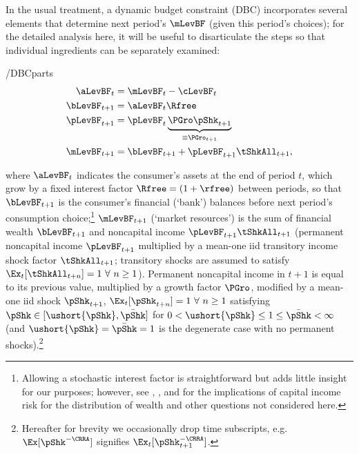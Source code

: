 \documentclass[BufferStockTheory]{subfiles}
\begin{document}
In the usual treatment, a dynamic budget constraint (DBC) incorporates
several elements that determine next period's $\mLevBF$ (given this
period's choices); for the detailed analysis here, it will be useful to
disarticulate the steps so that individual ingredients can be separately examined:\hypertarget{DBCParts}{}
\begin{verbatimwrite}{\EqDir/DBCparts}
  \begin{align}
    \aLevBF_{t}    & = \mLevBF_{t}-\cLevBF_{t}  \label{eq:DBCparts} \\
    \bLevBF_{t+1}    & = \aLevBF_{t} \Rfree \notag \\
    \pLevBF_{t+1}  & = \pLevBF_{t} \underbrace{\PGro\pShk_{t+1}}_{\equiv \PGro_{t+1}}  \notag \\
    \mLevBF_{t+1}  & =  \bLevBF_{t+1} +\pLevBF_{t+1}\tShkAll_{t+1},  \notag
  \end{align}
\end{verbatimwrite}
 where $\aLevBF_{t}$ indicates the consumer's assets at the end of period $t$, which grow by a fixed interest factor $\Rfree =(1+\rfree)$ between periods,  so that $\bLevBF_{t+1}$ is the consumer's financial (`bank') balances before next period's consumption choice;\footnote{Allowing a stochastic interest factor is straightforward but adds little insight for our purposes; however, see \cite{benhabibWealth}, \cite{maTodaRich}, and \cite{mstIncFluct} for the implications of capital income risk for the distribution of wealth and other questions not considered here.} $\mLevBF_{t+1}$ (`market resources') is the sum of financial wealth $\bLevBF_{t+1}$ and noncapital income $\pLevBF_{t+1}\tShkAll_{t+1}$ (permanent noncapital income $\pLevBF_{t+1}$ multiplied by a mean-one iid transitory income shock factor $\tShkAll_{t+1}$; transitory shocks are assumed to satisfy $\Ex_{t}[{\tShkAll}_{t+n}]=1~\forall~n\geq 1$). Permanent noncapital income in $t+1$ is equal to its previous value, multiplied by a growth factor $\PGro$, modified by a mean-one iid shock $\pShk_{t+1}$, $\Ex_{t}[{\pShk}_{t+n}]=1~\forall~n \geq 1$ satisfying $\pShk \in [\ushort{\pShk},\bar{\pShk}]$ for $0 < \ushort{\pShk} \leq 1 \leq \bar{\pShk} < \infty$ (and $\ushort{\pShk}=\bar{\pShk}=1$ is the degenerate case with no permanent shocks).\footnote{Hereafter for brevity we occasionally drop time subscripts, e.g.\ $\Ex[\pShk^{-\CRRA}]$ signifies $\Ex_{t}[\pShk_{t+1}^{-\CRRA}]$.}
\end{document}
